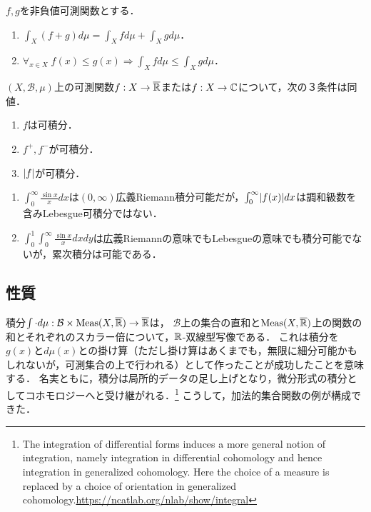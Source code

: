 \documentclass[uplatex, dvipdfmx]{jsreport}
\renewcommand{\B}{\mathcal{B}}
\begin{document}
\begin{lemma}[非負値可測関数の紡ぐ論理]\label{lemma-integral-for-nonnegative-measurables}
    $f,g$を非負値可測関数とする．
    \begin{enumerate}
        \item $\int_X(f+g)d\mu=\int_Xfd\mu+\int_Xgd\mu$．
        \item $\forall_{x\in X}\;f(x)\le g(x)\Rightarrow\int_Xfd\mu\le\int_Xgd\mu$．
    \end{enumerate}
\end{lemma}

\begin{theorem}[可積分性の特徴付け]\label{thm-characterization-of-integrability}
    $(X,\B,\mu)$上の可測関数$f:X\to\overline{\mathbb{R}}$または$f:X\to\mathbb{C}$について，次の３条件は同値．
    \begin{enumerate}
        \item $f$は可積分．
        \item $f^+,f^-$が可積分．
        \item $\lvert f\rvert$が可積分．
    \end{enumerate}
\end{theorem}

\begin{remark}[Lebesgue可積分性と広義Riemann積分]\mbox{}\label{remark-Lebesgue-integral-and-Riemann-integral}
    \begin{enumerate}
        \item $\int^\infty_0\frac{\sin x}{x}dx$は$(0,\infty)$広義Riemann積分可能だが，$\int^\infty_0\lvert f(x)\rvert dx$は調和級数を含みLebesgue可積分ではない．
        \item $\int^1_0\int^\infty_0\frac{\sin x}{x}dxdy$は広義Riemannの意味でもLebesgueの意味でも積分可能でないが，累次積分は可能である．
    \end{enumerate}
\end{remark}

\subsection{性質}

\begin{tcolorbox}[colframe=ForestGreen, colback=ForestGreen!10!white,breakable,colbacktitle=ForestGreen!40!white,coltitle=black,fonttitle=\bfseries\sffamily,
title=]
    積分$\int\cdot d\mu:\B\times\Meas(X,\o{\R})\to\o{\R}$は，
    $\B$上の集合の直和と$\mathrm{Meas}(X,\overline{\mathbb{R}})$上の関数の和とそれぞれのスカラー倍について，$\mathbb{R}$-双線型写像である．
    これは積分を$g(x)$と$d\mu(x)$との掛け算（ただし掛け算はあくまでも，無限に細分可能かもしれないが，可測集合の上で行われる）として作ったことが成功したことを意味する．
    名実ともに，積分は局所的データの足し上げとなり，微分形式の積分としてコホモロジーへと受け継がれる．\footnote{The integration of differential forms induces a more general notion of integration, namely integration in differential cohomology and hence integration in generalized cohomology. Here the choice of a measure is replaced by a choice of orientation in generalized cohomology.\url{https://ncatlab.org/nlab/show/integral}}
    こうして，加法的集合関数の例が構成できた．
\end{tcolorbox}
\end{document}

